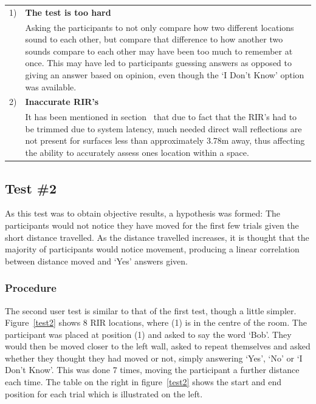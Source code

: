 \documentclass[../../main.tex]{subfiles}
\begin{document}
			\begin{tabular}{l p{} }
			1) & \textbf{The test is too hard} \\
			& Asking the participants to not only compare how two different locations sound to each other, but compare that difference to how another two sounds compare to each other may have been too much to remember at once. This may have led to participants guessing answers as opposed to giving an answer based on opinion, even though the `I Don't Know' option was available. \\
			2) & \textbf{Inaccurate \ac{RIR}'s} \\
			& It has been mentioned in section~\nameref{RIRtrimming} that due to fact that the \ac{RIR}'s had to be trimmed due to system latency, much needed direct wall reflections are not present for surfaces less than approximately 3.78m away, thus affecting the ability to accurately assess ones location within a space.
			\end{tabular}

		\subsection{Test \#2}
			As this test was to obtain objective results, a hypothesis was formed: The participants would not notice they have moved for the first few trials given the short distance travelled. As the distance travelled increases, it is thought that the majority of participants would notice movement, producing a linear correlation between distance moved and `Yes' answers given.

			\subsubsection{Procedure}
				The second user test is similar to that of the first test, though a little simpler. Figure~\ref{test2} shows 8 \ac{RIR} locations, where (1) is in the centre of the room. The participant was placed at position (1) and asked to say the word `Bob'. They would then be moved closer to the left wall, asked to repeat themselves and asked whether they thought they had moved or not, simply answering `Yes', `No' or `I Don't Know'. This was done 7 times, moving the participant a further distance each time. The table on the right in figure~\ref{test2} shows the start and end position for each trial which is illustrated on the left.
\end{document}
